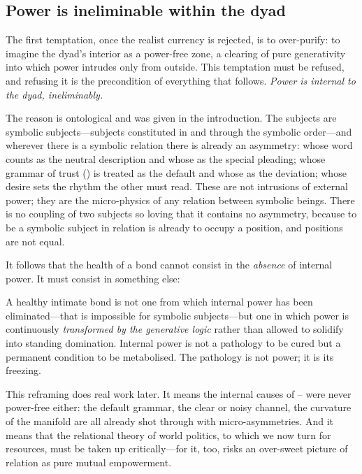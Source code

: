 \subsection{Power is ineliminable within the dyad}
\label{p17:sub:ir-internal}

The first temptation, once the realist currency is rejected, is to over-purify: to imagine the dyad's interior as a power-free zone, a clearing of pure generativity into which power intrudes only from outside. This temptation must be refused, and refusing it is the precondition of everything that follows. \emph{Power is internal to the dyad, ineliminably.}

The reason is ontological and was given in the introduction. The subjects are symbolic subjects---subjects constituted in and through the symbolic order---and wherever there is a symbolic relation there is already an asymmetry: whose word counts as the neutral description and whose as the special pleading; whose grammar of trust () is treated as the default and whose as the deviation; whose desire sets the rhythm the other must read. These are not intrusions of external power; they are the micro-physics of any relation between symbolic beings. There is no coupling of two subjects so loving that it contains no asymmetry, because to be a symbolic subject in relation is already to occupy a position, and positions are not equal.

It follows that the health of a bond cannot consist in the \emph{absence} of internal power. It must consist in something else:

\begin{claim}
A healthy intimate bond is not one from which internal power has been eliminated---that is impossible for symbolic subjects---but one in which power is continuously \emph{transformed by the generative logic} rather than allowed to solidify into standing domination. Internal power is not a pathology to be cured but a permanent condition to be metabolised. The pathology is not power; it is its freezing.
\end{claim}

\noindent
This reframing does real work later. It means the internal causes of -- were never power-free either: the default grammar, the clear or noisy channel, the curvature of the manifold are all already shot through with micro-asymmetries. And it means that the relational theory of world politics, to which we now turn for resources, must be taken up critically---for it, too, risks an over-sweet picture of relation as pure mutual empowerment.

